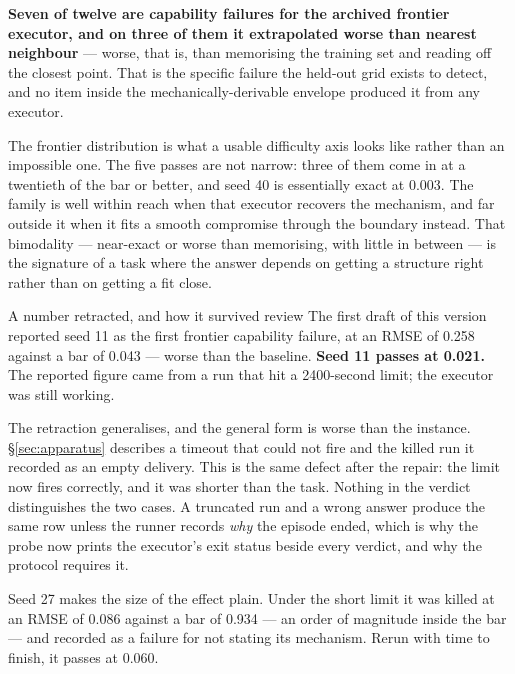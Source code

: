 \documentclass[11pt]{article}
\theoremstyle{definition}
\begin{document}
\textbf{Seven of twelve are capability failures for the archived frontier executor, and on three of them it extrapolated worse than nearest neighbour} --- worse, that is, than memorising the training set and reading off the closest point. That is the specific failure the held-out grid exists to detect, and no item inside the mechanically-derivable envelope produced it from any executor.

The frontier distribution is what a usable difficulty axis looks like rather than an impossible one. The five passes are not narrow: three of them come in at a twentieth of the bar or better, and seed 40 is essentially exact at 0.003. The family is well within reach when that executor recovers the mechanism, and far outside it when it fits a smooth compromise through the boundary instead. That bimodality --- near-exact or worse than memorising, with little in between --- is the signature of a task where the answer depends on getting a structure right rather than on getting a fit close.

\begin{cautionbox}{A number retracted, and how it survived review}
The first draft of this version reported seed 11 as the first frontier capability failure, at an RMSE of 0.258 against a bar of 0.043 --- worse than the baseline. \textbf{Seed 11 passes at 0.021.} The reported figure came from a run that hit a 2400-second limit; the executor was still working.

The retraction generalises, and the general form is worse than the instance. \S\ref{sec:apparatus} describes a timeout that could not fire and the killed run it recorded as an empty delivery. This is the same defect after the repair: the limit now fires correctly, and it was shorter than the task. Nothing in the verdict distinguishes the two cases. A truncated run and a wrong answer produce the same row unless the runner records \emph{why} the episode ended, which is why the probe now prints the executor's exit status beside every verdict, and why the protocol requires it.

Seed 27 makes the size of the effect plain. Under the short limit it was killed at an RMSE of 0.086 against a bar of 0.934 --- an order of magnitude inside the bar --- and recorded as a failure for not stating its mechanism. Rerun with time to finish, it passes at 0.060.
\end{cautionbox}
\end{document}
